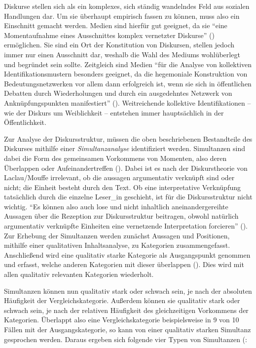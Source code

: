 \documentclass[12pt, titlepage=true, toc=bib]{scrartcl}
\begin{document}
{Diskurse stellen sich als ein komplexes, sich ständig wandelndes Feld aus sozialen Handlungen dar. Um sie überhaupt empirisch fassen zu können, muss also ein Einschnitt gemacht werden. Medien sind hierfür gut geeignet, da sie "`eine Momentaufnahme eines Ausschnittes komplex vernetzter Diskurse"' (\cite[8]{bruell_chancen_2006}) ermöglichen. Sie sind ein Ort der Konstitution von Diskursen, stellen jedoch immer nur einen Ausschnitt dar, weshalb die Wahl des Mediums wohlüberlegt und begründet sein sollte. Zeitgleich sind Medien "`für die Analyse von kollektiven Identifikationsmustern besonders geeignet, da die hegemoniale Konstruktion von Bedeutungsnetzwerken vor allem dann erfolgreich ist, wenn sie sich in öffentlichen Debatten durch Wiederholungen und durch ein ausgedehntes Netzwerk von Anknüpfungspunkten manifestiert"' (\cite[202]{nonhoff_kollektive_2007}). Weitreichende kollektive Identifikationen -- wie der Diskurs um Weiblichkeit -- entstehen immer hauptsächlich in der Öffentlichkeit. 

Zur Analyse der Diskursstruktur, müssen die oben beschriebenen Bestandteile des Diskurses mithilfe einer \textit{Simultanzanalyse} identifiziert werden. Simultanzen sind dabei die Form des gemeinsamen Vorkommens von Momenten, also deren Überlappen oder Aufeinandertreffen (\cite[11][vgl.]{bruell_chancen_2006}). Dabei ist es nach der Diskurstheorie von Laclau/Mouffe irrelevant, ob die aussagen argumentativ verknüpft sind oder nicht; die Einheit besteht durch den Text. Ob eine interpretative Verknüpfung tatsächlich durch die einzelne Leser\_in geschieht, ist für die Diskursstruktur nicht wichtig. "`Es können also auch lose und nicht inhaltlich aneinandergereihte Aussagen über die Rezeption zur Diskursstruktur beitragen, obwohl natürlich argumentativ verknüpfte Einheiten eine vernetzende Interpretation forcieren"' (\cite[9]{bruell_chancen_2006}). Zur Erhebung der Simultanzen werden zunächst Aussagen und Positionen, mithilfe einer qualitativen Inhaltsanalyse, zu Kategorien zusammengefasst. Anschließend wird eine qualitativ starke Kategorie als Ausgangspunkt genommen und erfasst, welche anderen Kategorien mit dieser überlappen (\cite[vgl.][205]{nonhoff_kollektive_2007}). Dies wird mit allen qualitativ relevanten Kategorien wiederholt.

Simultanzen können nun qualitativ stark oder schwach sein, je nach der absoluten Häufigkeit der Vergleichskategorie. Außerdem können sie qualitativ stark oder schwach sein, je nach der relativen Häufigkeit des gleichzeitigen Vorkommens der Kategorien. Überlappt also eine Vergleichskategorie beispielsweise in 9 von 10 Fällen mit der Ausgangskategorie, so kann von einer qualitativ starken Simultanz gesprochen werden. Daraus ergeben sich folgende vier Typen von Simultanzen (\cite[vgl.][12]{bruell_chancen_2006}:

}
\end{document}
